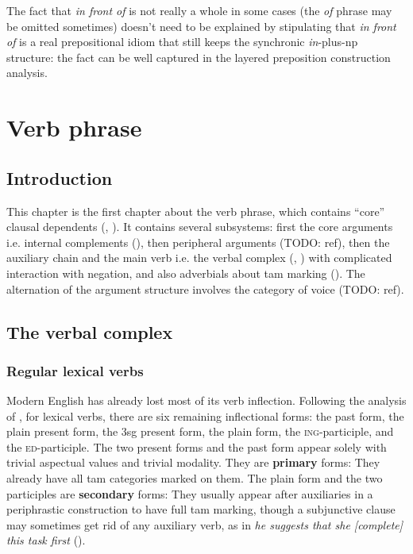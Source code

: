 \documentclass[UTF8, a4paper, oneside, scheme=plain, 12pt]{ctexbook}
\newcommand*{\citesec}[1]{\S~{#1}}
\newcommand*{\citechap}[1]{Ch.~{#1}}
\newcommand*{\citechapsec}[2]{\citechap{#1}.\citesec{#2}}
\newcommand*{\concept}[1]{\textbf{#1}}
\newcommand{\form}[1]{\emph{#1}}
\newcommand{\formcat}[1]{\textsc{#1}}
\begin{document}
The fact that \form{in front of} is not really a whole in some cases 
(the \form{of} phrase may be omitted sometimes) 
doesn't need to be explained by stipulating that 
\form{in front of} is a real prepositional idiom that 
still keeps the synchronic \form{in}-plus-\acs{np} structure:
the fact can be well captured in the layered preposition construction analysis.

\chapter{Verb phrase}\label{chap:verb-phrase}

\section{Introduction}

This chapter is the first chapter about the verb phrase,
which contains ``core'' clausal dependents 
(, ).
It contains several subsystems: 
first the core arguments i.e. internal complements (),
then peripheral arguments (TODO: ref), 
then the auxiliary chain and the main verb i.e. the verbal complex
(, ) 
with complicated interaction with negation, 
and also adverbials about \acs{tam} marking 
(). 
The alternation of the argument structure involves the category of voice (TODO: ref).

\section{The verbal complex}\label{sec:verbal-complex}


\subsection{Regular lexical verbs}\label{sec:verb-forms}

Modern English has already lost most of its verb inflection.
Following the analysis of \citet[\citechapsec{3}{1.1}]{cgel},
for lexical verbs,
there are six remaining inflectional forms: 
the past form, the plain present form, 
the 3sg present form,
the plain form, the \formcat{ing}-participle,
and the \formcat{ed}-participle.
The two present forms and the past form appear solely 
with trivial aspectual values and trivial modality.
They are \concept{primary} forms:
They already have all \acs{tam} categories marked on them.
The plain form and the two participles are \concept{secondary} forms:
They usually appear after auxiliaries 
in a periphrastic construction to have full \acs{tam} marking,
though a subjunctive clause may sometimes get rid of any auxiliary verb,
as in \form{he suggests that she [complete] this task first} ().
\end{document}
